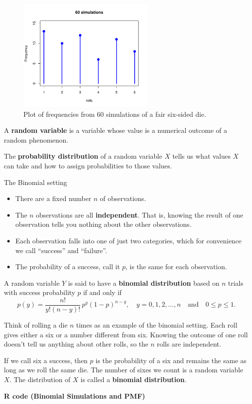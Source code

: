 \begin{figure}[H]
  \centering
  \includegraphics[width=0.6\textwidth]{section11/images/simulation_60.pdf} %
  \caption{Plot of frequencies from 60 simulations of a fair six-sided die.}
\end{figure}
\begin{definition}
A \textbf{random variable} is a variable whose value is a numerical outcome of a random phenomenon.

The \textbf{probability distribution} of a random variable $X$ tells us what values $X$ can take and how to assign probabilities to those values.
\end{definition}
\begin{nt}{The Binomial setting}
\begin{itemize}
  \item There are a fixed number $n$ of observations.
  \item The $n$ observations are all \textbf{independent}. That is, knowing the result of one observation tells you nothing about the other observations.
  \item Each observation falls into one of just two categories, which for convenience we call “success” and “failure”.
  \item The probability of a success, call it $p$, is the same for each observation.
\end{itemize}
\end{nt}
\noindent A random variable $Y$ is said to have a \textbf{binomial distribution} based on $n$ trials with success probability $p$ if and only if
\[
p(y) = \frac{n!}{y!(n - y)!} \, p^y (1 - p)^{n - y}, \quad y = 0, 1, 2, \ldots, n \quad \text{and} \quad 0 \leq p \leq 1.
\]
\begin{example}
Think of rolling a die $n$ times as an example of the binomial setting. Each roll gives either a six or a number different from six. Knowing the outcome of one roll doesn’t tell us anything about other rolls, so the $n$ rolls are independent. 

If we call six a success, then $p$ is the probability of a six and remains the same as long as we roll the same die. The number of sixes we count is a random variable $X$. The distribution of $X$ is called a \textbf{binomial distribution}.
\end{example}
\vspace{1em}
\noindent\textbf{R code (Binomial Simulations and PMF)}

